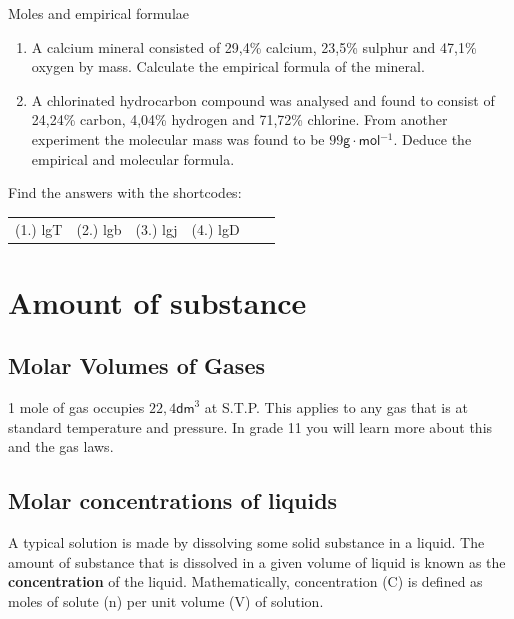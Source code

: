\begin{exercises}{Moles and empirical formulae
      }
\begin{enumerate}[noitemsep, label=\textbf{\arabic*}. ]
\begin{enumerate}[noitemsep, label=\textbf{\alph*}. ]
\label{m38712*uid81}\item Determine the formula of zinc sulphide.
\end{enumerate}
                \label{m38712*uid82}\item A calcium mineral consisted of 29,4\% calcium, 23,5\% sulphur and 47,1\% oxygen by mass. Calculate the empirical formula of the mineral.\newline
\label{m38712*uid83}\item A chlorinated hydrocarbon compound was analysed and found to consist of 24,24\% carbon, 4,04\% hydrogen and 71,72\% chlorine. From another experiment the molecular mass was found to be $99\mathsf{g}\ensuremath{\cdot}\mathsf{mol}{}^{-1}$. Deduce the empirical and molecular formula.\newline
\end{enumerate}
    \label{m38712*cid7}
\par {} Find the answers with the shortcodes:
 \par \begin{tabular}[h]{cccccc}
 (1.) lgT  &  (2.) lgb  &  (3.) lgj  &  (4.) lgD  & \end{tabular}
\end{exercises}
\section{Amount of substance}
            \subsection*{Molar Volumes of Gases}
            \nopagebreak
            \par
            \label{m38712*eip-id1168064596799}
  { \label{m38712*eip-id1168053572222}1 mole of gas occupies $22,4{\mathsf{dm}}^{3}$ at S.T.P. } 
      \label{m38712*id282112}This applies to any gas that is at standard temperature and pressure. In grade 11 you will learn more about this and the gas laws.\par 
    \label{m38712*cid8}
            \subsection*{Molar concentrations of liquids}
            \nopagebreak
      \label{m38712*id282848}A typical solution is made by dissolving some solid substance in a liquid. The amount of substance that is dissolved in a given volume of liquid is known as the \textbf{concentration} of the liquid. Mathematically, concentration (C) is defined as moles of solute (n) per unit volume (V) of solution.\par 
      \label{m38712*id282860}\nopagebreak\noindent{}
        
